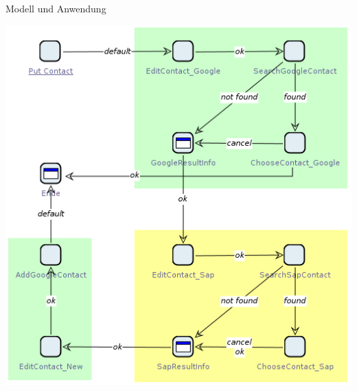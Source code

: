 \subsection*{}
\begin{frame}{Modell und Anwendung}
\begin{center}
\includegraphics[height=0.8\textheight]{Bilder/jabc_Model.png} 
\end{center}
\end{frame}



